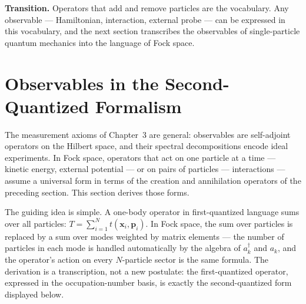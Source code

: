 \medskip\noindent\textbf{Transition.}
Operators that add and remove particles are the vocabulary. Any observable --- Hamiltonian, interaction, external probe --- can be expressed in this vocabulary, and the next section transcribes the observables of single-particle quantum mechanics into the language of Fock space.

\section{Observables in the Second-Quantized Formalism}
\label{sec:second-quantized-observables}

The measurement axioms of Chapter~3 are general: observables are self-adjoint operators on the Hilbert space, and their spectral decompositions encode ideal experiments. In Fock space, operators that act on one particle at a time --- kinetic energy, external potential --- or on pairs of particles --- interactions --- assume a universal form in terms of the creation and annihilation operators of the preceding section. This section derives those forms.

The guiding idea is simple. A one-body operator in first-quantized language sums over all particles: $T = \sum_{i=1}^N t(\bm x_i, \bm p_i)$. In Fock space, the sum over particles is replaced by a sum over modes weighted by matrix elements --- the number of particles in each mode is handled automatically by the algebra of $a_k^\dagger$ and $a_k$, and the operator's action on every $N$-particle sector is the same formula. The derivation is a transcription, not a new postulate: the first-quantized operator, expressed in the occupation-number basis, is exactly the second-quantized form displayed below.

